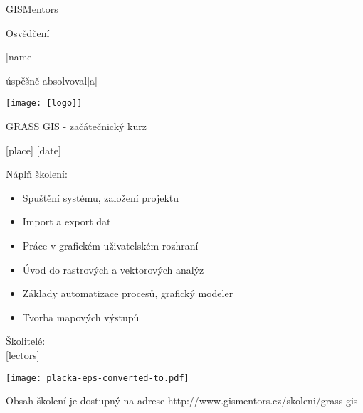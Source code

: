 \documentclass[12pt, a4paper]{letter}
\begin{document}
\pagestyle{empty}
\begin{center}

{\Large GISMentors}

{\Huge Osvědčení}

{\Large [name]}

úspěšně absolvoval[a]

\texttt{[image: [logo]]}

{\Large GRASS GIS - začátečnický kurz}

[place] [date]
\end{center}

Náplň školení:

\begin{itemize}
    \item Spuštění systému, založení projektu
    \item Import a export dat
    \item Práce v grafickém uživatelském rozhraní
    \item Úvod do rastrových a vektorových analýz
    \item Základy automatizace procesů, grafický modeler
    \item Tvorba mapových výstupů
\end{itemize}

\vfill
\parbox{7cm}{

    Školitelé: \\

    [lectors]

}
\hfill
\parbox{3cm}{
        \texttt{[image: placka-eps-converted-to.pdf]}
}

\vfill

\begin{center}
{\footnotesize Obsah školení je dostupný na adrese
http://www.gismentors.cz/skoleni/grass-gis}
\end{center}
\end{document}
